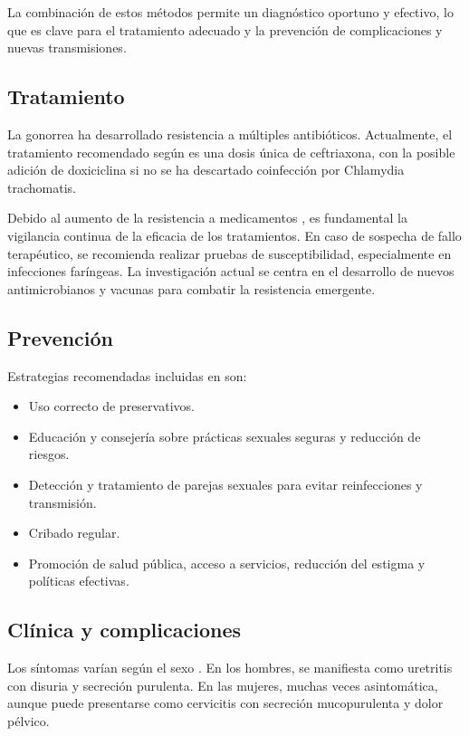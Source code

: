 \begin{enumerate}
La combinación de estos métodos permite un diagnóstico oportuno y efectivo, lo que es clave para el tratamiento adecuado y la prevención de complicaciones y nuevas transmisiones.

\subsection{Tratamiento}
La gonorrea ha desarrollado resistencia a múltiples antibióticos. Actualmente, el tratamiento recomendado según \cite{cyr2020update} es una dosis única de ceftriaxona, con la posible adición de doxiciclina si no se ha descartado coinfección por Chlamydia trachomatis.

Debido al aumento de la resistencia a medicamentos \cite{unemo2019antimicrobial}, es fundamental la vigilancia continua de la eficacia de los tratamientos. En caso de sospecha de fallo terapéutico, se recomienda realizar pruebas de susceptibilidad, especialmente en infecciones faríngeas. La investigación actual se centra en el desarrollo de nuevos antimicrobianos y vacunas para combatir la resistencia emergente.

\subsection{Prevención}
Estrategias recomendadas incluidas en \cite{mayor2012diagnosis} son:
\begin{itemize}
    \item Uso correcto de preservativos.
    \item Educación y consejería sobre prácticas sexuales seguras y reducción de riesgos.
    \item Detección y tratamiento de parejas sexuales para evitar reinfecciones y transmisión. 
    \item Cribado regular.
    \item Promoción de salud pública, acceso a servicios, reducción del estigma y políticas efectivas.
\end{itemize}

\subsection{Clínica y complicaciones}
Los síntomas varían según el sexo \cite{unemo2019gonorrhoea}. En los hombres, se manifiesta como uretritis con disuria y secreción purulenta. En las mujeres, muchas veces asintomática, aunque puede presentarse como cervicitis con secreción mucopurulenta y dolor pélvico.


\end{enumerate}
